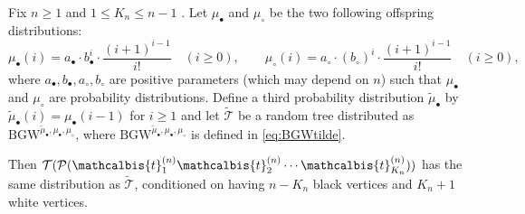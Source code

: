 \documentclass[10pt]{amsart}
\theoremstyle{definition}\newtheorem{defi}[theo]{Definition}\newtheorem{rema}[theo]{Remark}\newtheorem{exam}[theo]{Example}\newtheorem{exem}[theo]{Example}\newtheorem{nota}[theo]{Notation}
\def\PPP{\mathcal P}
\def\tmub{\widetilde{\mu}_{\bullet}}
\def\ab{a_{\bullet}}
\def\ac{a_{\circ}}
\def\bb{b_{\bullet}}
\def\bc{b_{\circ}}
\def\mub{\mu_{\bullet}}
\def\muc{\mu_{\circ}}
\def\tTs{\tilde{\Ts}}
\newcommand\BGW{\textrm{BGW}}
\def\tb{\mathcalbis{t}}
\def\Ts{\mathscr{T}}
\begin{document}
\begin{proposition}\label{prop:bitype}
Fix $n \geq 1$ and $1 \leq K_{n} \leq n-1$ . Let $\mub$ and $\muc$ be the two following offspring distributions:
\[\mub(i)= \ab \cdot  \bb^{i} \cdot \frac{(i+1)^{i-1}}{i!}  \quad (i \geq 0), \qquad \muc(i)= \ac \cdot  (\bc)^{i} \cdot \frac{(i+1)^{i-1}}{i!}  \quad (i \geq 0),\]
where $\ab,\bb,\ac,\bc$ are positive parameters (which may depend on $n$)
such that $\mub$ and $\muc$ are probability distributions.
Define a third probability distribution $\widetilde{\mu}_{\bullet}$
 by $\widetilde{\mu}_{\bullet}(i)=\mub(i-1)$ for $i \geq 1$
 and let $ \tTs$ be a random tree distributed as ${\BGW}^{\tmub,\mub,\muc}$,
 where ${\BGW}^{\tmub,\mub,\muc}$ is defined in \eqref{eq:BGWtilde}.

Then $ \mathcal{T}( \PPP( \tb_{1}^{(n)} \tb_{2}^{(n)} \cdots \tb_{K_{n}}^{(n)}))$ has the same distribution as $ \tilde{\mathscr{T}}$, conditioned on having $n-K_{n}$ black vertices and $K_{n}+1$ white vertices.
\end{proposition}
\end{document}
